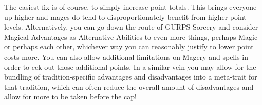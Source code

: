 \begin{multicols}{2}
	The easiest fix is of course, to simply increase point totals. This brings everyone up higher and mages do tend to disproportionately benefit from higher point levels. Alternatively, you can go down the route of GURPS Sorcery and consider Magical Advantages as Alternative Abilities to even more things, perhaps Magic or perhaps each other, whichever way you can reasonably justify to lower point costs more. You can also allow additional limitations on Magery and spells in order to eek out those additional points, In a similar vein you may allow for the bundling of tradition-specific advantages and disadvantages into a meta-trait for that tradition, which can often reduce the overall amount of disadvantages and allow for more to be taken before the cap!
	
\end{multicols}